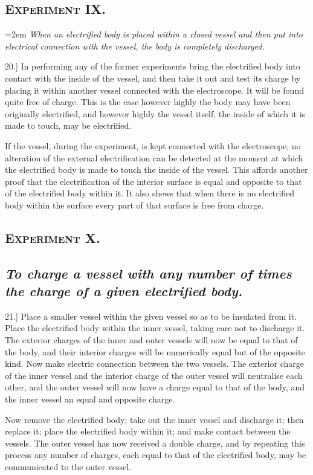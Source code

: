 \documentclass[12pt,oneside]{book}[2021/10/04]
\newcommand{\Heading}{\centering\normalfont}
\newcommand{\Section}[1]{\subsection*{\normalsize\Heading\scshape #1}}
\newcommand{\Subsection}[1]{\subsection*{\normalsize\Heading\itshape #1}}
\newcommand{\Runhead}[1]{\fancyhead[C]{\iffloatpage{}{\small#1}}}
\newcommand{\article}[1]{\phantomsection \label{art:#1}{#1.]}}
\newcommand{\hangpara}[1]{\hangindent=2em {\itshape #1} \vspace{1ex}}
\newcommand{\¬}{\hphantom{0}}
\begin{document}
\Section{Experiment IX.}

\hangpara{
When an electrified body is placed within a closed vessel and then
put into electrical connection with the vessel, the body is completely
discharged.}

\article{20} In performing any of the former experiments bring the
electrified body into contact with the inside of the vessel, and
then take it out and test its charge by placing it within another
vessel connected with the electroscope. It will be found quite
free of charge. This is the case however highly the body may
have been originally electrified, and however highly the vessel
itself, the inside of which it is made to touch, may be electrified.
\Runhead{TO DISCHARGE A BODY COMPLETELY.}

If the vessel, during the experiment, is kept connected with the
electroscope, no alteration of the external electrification can be
detected at the moment at which the electrified body is made to
touch the inside of the vessel. This affords another proof that
the electrification of the interior surface is equal and opposite to
that of the electrified body within it. It also shews that when
there is no electrified body within the surface every part of that
surface is free from charge.

\Section{Experiment X.}

\Subsection{To charge a vessel with any number of times the charge of a given
electrified body.}

\article{21} Place a smaller vessel within the given vessel so as to be
insulated from it. Place the electrified body within the inner
vessel, taking care not to discharge it. The exterior
charges of the inner and outer vessels will
now be equal to that of the body, and their interior
charges will be numerically equal but of
the opposite kind. Now make electric connection
between the two vessels. The exterior charge of
the inner vessel and the interior charge of the
outer vessel will neutralise each other, and the
outer vessel will now have a charge equal to that
of the body, and the inner vessel an equal and opposite
charge.

Now remove the electrified body; take out the
inner vessel and discharge it; then replace it;
place the electrified body within it; and make contact between the
vessels. The outer vessel has now received a double charge, and
by repeating this process any number of charges, each equal to
that of the electrified body, may be communicated to the outer
vessel.
\end{document}
